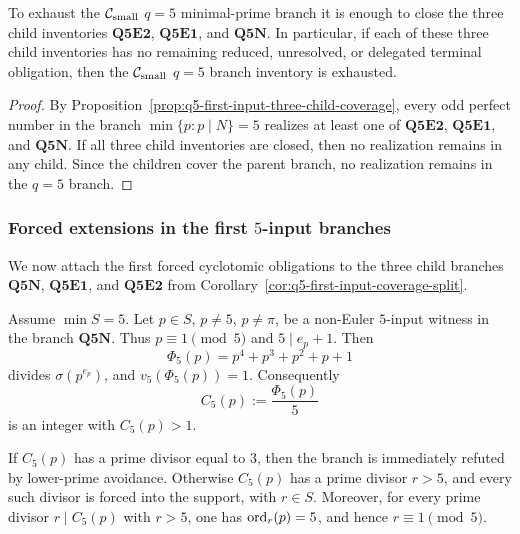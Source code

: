 \begin{corollary}[Reduction of the \(q=5\) branch to the three certified children]
\label{cor:q5-reduction-to-three-certified-children}
To exhaust the \(\mathcal C_{\mathrm{small}}\) \(q=5\) minimal-prime branch it is enough to close
the three child inventories \(\mathbf{Q5E2}\), \(\mathbf{Q5E1}\), and
\(\mathbf{Q5N}\).
In particular, if each of these three child inventories has no remaining
reduced, unresolved, or delegated terminal obligation, then the \(\mathcal C_{\mathrm{small}}\)
\(q=5\) branch inventory is exhausted.
\end{corollary}

\begin{proof}
By Proposition~\ref{prop:q5-first-input-three-child-coverage}, every odd perfect
number in the branch
\(\min\{p:p\mid N\}=5\) realizes at least one of \(\mathbf{Q5E2}\),
\(\mathbf{Q5E1}\), and \(\mathbf{Q5N}\).
If all three child inventories are closed, then no realization remains in any
child.  Since the children cover the parent branch, no realization remains in
the \(q=5\) branch.
\end{proof}



\subsubsection{Forced extensions in the first $5$-input branches}

We now attach the first forced cyclotomic obligations to the three child
branches \(\mathbf{Q5N}\), \(\mathbf{Q5E1}\), and \(\mathbf{Q5E2}\) from
Corollary~\ref{cor:q5-first-input-coverage-split}.

\begin{lemma}
\label{lem:q5n-forced-extension}
Assume \(\min S=5\).  Let \(p\in S\), \(p\ne5\), \(p\ne\pi\), be a non-Euler
\(5\)-input witness in the branch \(\mathbf{Q5N}\).  Thus
\(p\equiv1\pmod5\) and \(5\mid e_p+1\).
Then
\[
  \Phi_5(p)=p^4+p^3+p^2+p+1
\]
divides \(\sigma(p^{e_p})\), and \(v_5(\Phi_5(p))=1\).
Consequently
\[
  C_5(p):=\frac{\Phi_5(p)}5
\]
is an integer with \(C_5(p)>1\).

If \(C_5(p)\) has a prime divisor equal to \(3\), then the branch is immediately
refuted by lower-prime avoidance.  Otherwise \(C_5(p)\) has a prime divisor
\(r>5\), and every such divisor is forced into the support, with \(r\in S\).
Moreover, for every prime divisor \(r\mid C_5(p)\) with \(r>5\), one has
\(\operatorname{ord}_r(p)=5\), and hence \(r\equiv1\pmod5\).
\end{lemma}

